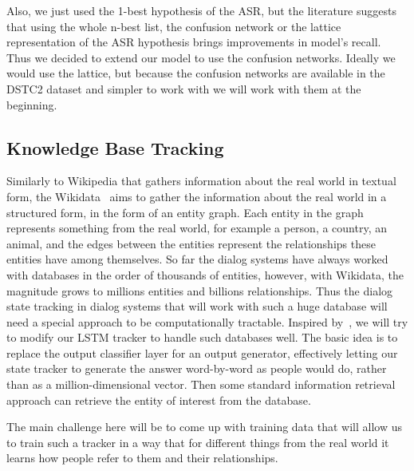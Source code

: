 \documentclass[10pt,twocolumn]{article}
\begin{document}
Also, we just used the 1-best hypothesis of the ASR, but the literature suggests that using the whole n-best list, the confusion network or the lattice representation of the ASR hypothesis brings improvements in model's recall. Thus we decided to extend our model to use the confusion networks. Ideally we would use the lattice, but because the confusion networks are available in the DSTC2 dataset and simpler to work with we will work with them at the beginning.

\subsection{Knowledge Base Tracking}
Similarly to Wikipedia that gathers information about the real world in textual form, the Wikidata~\cite{vrandevcic2012wikidata} aims to gather the information about the real world in a structured form, in the form of an entity graph. Each entity in the graph represents something from the real world, for example a person, a country, an animal, and the edges between the entities represent the relationships these entities have among themselves. So far the dialog systems have always worked with databases in the order of thousands of entities, however, with Wikidata, the magnitude grows to millions entities and billions relationships. Thus the dialog state tracking in dialog systems that will work with such a huge database will need a special approach to be computationally tractable. Inspired by~\cite{sutskever2014sequence}, we will try to modify our LSTM tracker to handle such databases well. The basic idea is to replace the output classifier layer for an output generator, effectively letting our state tracker to generate the answer word-by-word as people would do, rather than as a million-dimensional vector. Then some standard information retrieval approach can retrieve the entity of interest from the database.

The main challenge here will be to come up with training data that will allow us to train such a tracker in a way that for different things from the real world it learns how people refer to them and their relationships.








\end{document}
